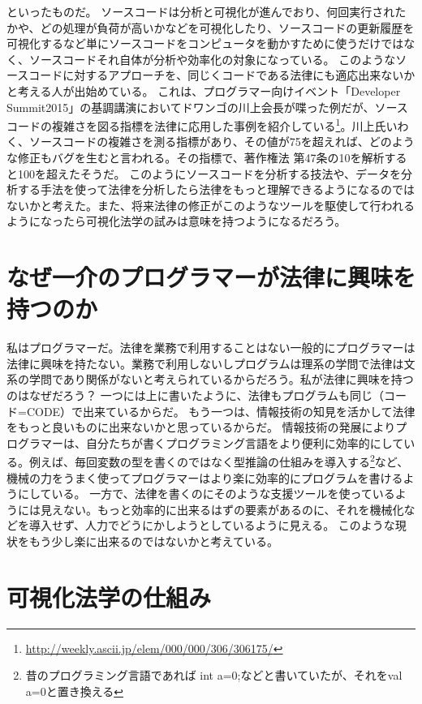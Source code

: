 \documentclass[a5j,openany,twoside]{jsbook}
\begin{document}
といったものだ。
ソースコードは分析と可視化が進んでおり、何回実行されたかや、どの処理が負荷が高いかなどを可視化したり、ソースコードの更新履歴を可視化するなど単にソースコードをコンピュータを動かすために使うだけではなく、ソースコードそれ自体が分析や効率化の対象になっている。
このようなソースコードに対するアプローチを、同じくコードである法律にも適応出来ないかと考える人が出始めている。
これは、プログラマー向けイベント「Developer Summit2015」の基調講演においてドワンゴの川上会長が喋った例だが、ソースコードの複雑さを図る指標を法律に応用した事例を紹介している\footnote{\url{http://weekly.ascii.jp/elem/000/000/306/306175/}}。川上氏いわく、ソースコードの複雑さを測る指標があり、その値が75を超えれば、どのような修正もバグを生むと言われる。その指標で、著作権法 第47条の10を解析すると100を超えたそうだ。
このようにソースコードを分析する技法や、データを分析する手法を使って法律を分析したら法律をもっと理解できるようになるのではないかと考えた。また、将来法律の修正がこのようなツールを駆使して行われるようになったら可視化法学の試みは意味を持つようになるだろう。

\section{なぜ一介のプログラマーが法律に興味を持つのか}

私はプログラマーだ。法律を業務で利用することはない一般的にプログラマーは法律に興味を持たない。業務で利用しないしプログラムは理系の学問で法律は文系の学問であり関係がないと考えられているからだろう。私が法律に興味を持つのはなぜだろう？
一つには上に書いたように、法律もプログラムも同じ（コード=CODE）で出来ているからだ。
もう一つは、情報技術の知見を活かして法律をもっと良いものに出来ないかと思っているからだ。
情報技術の発展によりプログラマーは、自分たちが書くプログラミング言語をより便利に効率的にしている。例えば、毎回変数の型を書くのではなく型推論の仕組みを導入する\footnote{昔のプログラミング言語であれば int a=0;などと書いていたが、それをval a=0と置き換える}など、機械の力をうまく使ってプログラマーはより楽に効率的にプログラムを書けるようにしている。
一方で、法律を書くのにそのような支援ツールを使っているようには見えない。もっと効率的に出来るはずの要素があるのに、それを機械化などを導入せず、人力でどうにかしようとしているように見える。
このような現状をもう少し楽に出来るのではないかと考えている。

\section{可視化法学の仕組み}
\end{document}
